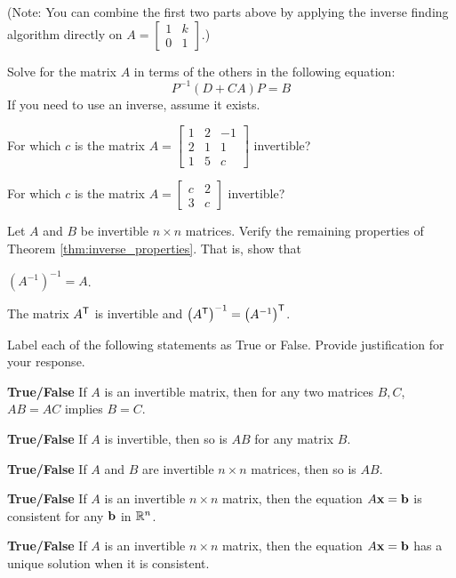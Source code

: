 (Note: You can combine the first two parts above by applying the inverse finding algorithm directly on $A = \left[ \begin{array}{cc} 1&k \\ 0&1 \end{array} \right]$.)

\item Solve for the matrix $A$ in terms of the others in the following equation:
\[ P^{-1}(D+CA)P=B\]
If you need to use an inverse, assume it exists.

\item For which $c$ is the matrix $A=\left[ \begin{array}{ccr} 1&2&-1\\2&1&1\\1&5&c\end{array} \right]$ invertible?

\item For which $c$ is the matrix $A=\left[ \begin{array}{cc} c&2\\3&c\end{array} \right]$ invertible?

\item Let $A$ and $B$ be invertible $n \times n$ matrices. Verify the remaining properties of Theorem \ref{thm:inverse_properties}. That is, show that 	
	\ba
	\item  $\left(A^{-1}\right)^{-1} = A$.
	\item The matrix $A^{\mathsf{T}}$ is invertible and $\left(A^{\mathsf{T}}\right)^{-1} = \left(A^{-1}\right)^{\mathsf{T}}$.
	\ea

\item Label each of the following statements as True or False. Provide justification for your response.
\ba
\item \textbf{True/False} If $A$ is an invertible matrix, then for any two matrices $B, C$, $AB=AC$ implies $B=C$.

\item \textbf{True/False} If $A$ is invertible, then so is $AB$ for any matrix $B$.

\item \textbf{True/False} If $A$ and $B$ are invertible $n\times n$ matrices, then so is $AB$.


\item \textbf{True/False} If $A$ is an invertible $n\times n$ matrix, then the equation $A\mathbf{x}=\mathbf{b}$ is consistent for any $\mathbf{b}$ in $\mathbb{R}^n$.

\item \textbf{True/False} If $A$ is an invertible $n\times n$ matrix, then the equation $A\mathbf{x}=\mathbf{b}$ has a unique solution when it is consistent.

